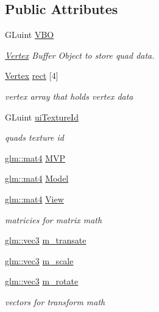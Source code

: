 \subsection*{Public Attributes}
\begin{DoxyCompactItemize}
\item 
G\+Luint \hyperlink{class_quad_af710bcaf3209f47cb75dfed003604fd4}{V\+B\+O}
\begin{DoxyCompactList}\small\item\em \hyperlink{struct_vertex}{Vertex} Buffer Object to store quad data. \end{DoxyCompactList}\item 
\hyperlink{struct_vertex}{Vertex} \hyperlink{class_quad_afaed261444ab07e840d903baff5c0624}{rect} \mbox{[}4\mbox{]}
\begin{DoxyCompactList}\small\item\em vertex array that holds vertex data \end{DoxyCompactList}\item 
G\+Luint \hyperlink{class_quad_a04b4a7628b803cdedfac290a26e97f75}{ui\+Texture\+Id}
\begin{DoxyCompactList}\small\item\em quad\textquotesingle{}s texture id \end{DoxyCompactList}\item 
\hyperlink{_sprite_8h_a2db59f395fe82a7394c6324956c265d8}{glm\+::mat4} \hyperlink{class_quad_a412bc084a6c764c235b546be5fc4a7b6}{M\+V\+P}
\item 
\hyperlink{_sprite_8h_a2db59f395fe82a7394c6324956c265d8}{glm\+::mat4} \hyperlink{class_quad_a31981a73c8503bf906450ab2caadd32b}{Model}
\item 
\hyperlink{_sprite_8h_a2db59f395fe82a7394c6324956c265d8}{glm\+::mat4} \hyperlink{class_quad_a25e399068755865ba1e2c25d01837863}{View}
\begin{DoxyCompactList}\small\item\em matricies for matrix math \end{DoxyCompactList}\item 
\hyperlink{_sprite_8h_a3d0ce73e3199de81565fb01632415288}{glm\+::vec3} \hyperlink{class_quad_a71b5296b41053bfc400e08c579997c0f}{m\+\_\+transate}
\item 
\hyperlink{_sprite_8h_a3d0ce73e3199de81565fb01632415288}{glm\+::vec3} \hyperlink{class_quad_a94d9fe0e5fa32916ab80f263a3dc43b4}{m\+\_\+scale}
\item 
\hyperlink{_sprite_8h_a3d0ce73e3199de81565fb01632415288}{glm\+::vec3} \hyperlink{class_quad_a0f056585749e1e4af52ea80c9e450353}{m\+\_\+rotate}
\begin{DoxyCompactList}\small\item\em vectors for transform math \end{DoxyCompactList}\end{DoxyCompactItemize}


